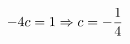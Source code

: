 \documentclass[preview]{standalone}
\begin{document}
\begin{align*}
\special{dvisvgm:raw <g id='unique000'>}-4c=1\Rightarrow c=-\frac14\special{dvisvgm:raw </g>}
\end{align*}
\end{document}
